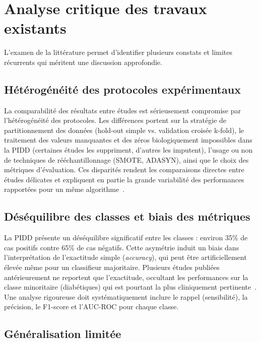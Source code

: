 \section{Analyse critique des travaux existants}

L'examen de la littérature permet d'identifier plusieurs constats et limites récurrents qui
méritent une discussion approfondie.

\subsection{Hétérogénéité des protocoles expérimentaux}

La comparabilité des résultats entre études est sérieusement compromise par l'hétérogénéité
des protocoles. Les différences portent sur la stratégie de partitionnement des données
(hold-out simple vs. validation croisée k-fold), le traitement des valeurs manquantes et des
zéros biologiquement impossibles dans la PIDD (certaines études les suppriment, d'autres les
imputent), l'usage ou non de techniques de rééchantillonnage (SMOTE, ADASYN), ainsi que le
choix des métriques d'évaluation. Ces disparités rendent les comparaisons directes entre
études délicates et expliquent en partie la grande variabilité des performances rapportées
pour un même algorithme~\citep{wee2024}.

\subsection{Déséquilibre des classes et biais des métriques}

La PIDD présente un déséquilibre significatif entre les classes : environ 35\% de cas
positifs contre 65\% de cas négatifs. Cette asymétrie induit un biais dans l'interprétation
de l'exactitude simple (\textit{accuracy}), qui peut être artificiellement élevée même pour
un classifieur majoritaire. Plusieurs études publiées antérieurement ne reportent que
l'exactitude, occultant les performances sur la classe minoritaire (diabétiques) qui est
pourtant la plus cliniquement pertinente~\citep{khanam2021, iparraguirre2023}. Une analyse
rigoureuse doit systématiquement inclure le rappel (sensibilité), la précision, le F1-score
et l'AUC-ROC pour chaque classe.

\subsection{Généralisation limitée}

